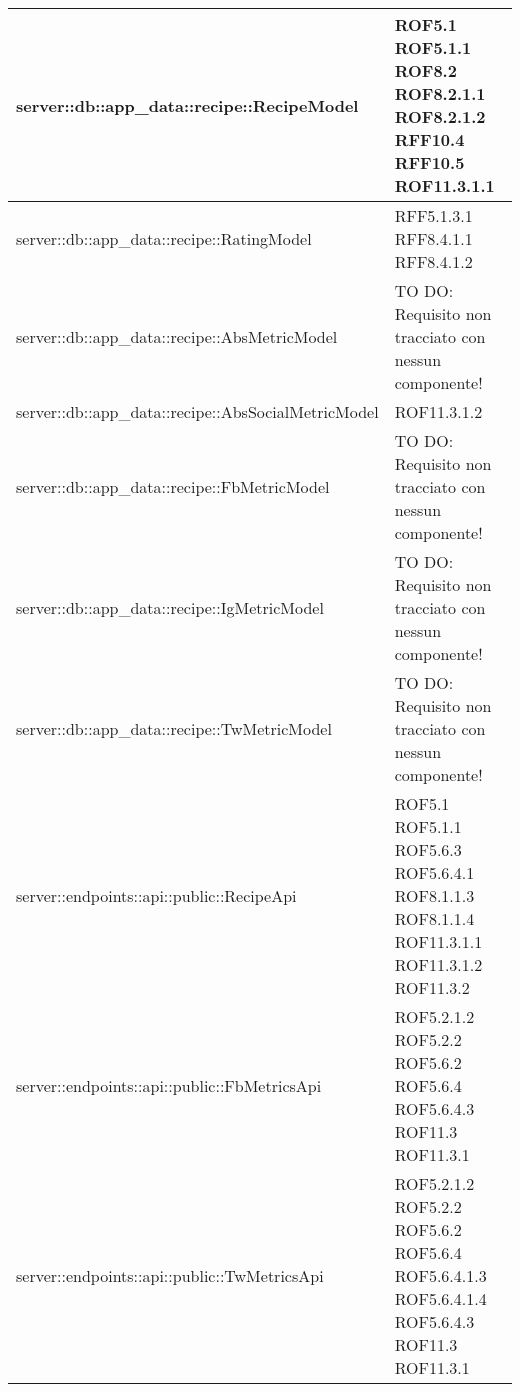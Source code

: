 \begin{center}
\begin{longtable}{| p{11cm} | p{2.5cm} |}
\hline
server::db::app\_data::recipe::RecipeModel & ROF5.1 \newline ROF5.1.1 \newline ROF8.2 \newline ROF8.2.1.1 \newline ROF8.2.1.2 \newline RFF10.4 \newline RFF10.5 \newline ROF11.3.1.1 \\
\hline
server::db::app\_data::recipe::RatingModel & RFF5.1.3.1 \newline RFF8.4.1.1 \newline RFF8.4.1.2 \\
\hline
server::db::app\_data::recipe::AbsMetricModel & TO DO: Requisito non tracciato con nessun componente! \\
\hline
server::db::app\_data::recipe::AbsSocialMetricModel & ROF11.3.1.2 \\
\hline
server::db::app\_data::recipe::FbMetricModel & TO DO: Requisito non tracciato con nessun componente! \\
\hline
server::db::app\_data::recipe::IgMetricModel & TO DO: Requisito non tracciato con nessun componente! \\
\hline
server::db::app\_data::recipe::TwMetricModel & TO DO: Requisito non tracciato con nessun componente! \\
\hline
server::endpoints::api::public::RecipeApi & ROF5.1 \newline ROF5.1.1 \newline ROF5.6.3 \newline ROF5.6.4.1 \newline ROF8.1.1.3 \newline ROF8.1.1.4 \newline ROF11.3.1.1 \newline ROF11.3.1.2 \newline ROF11.3.2 \\
\hline
server::endpoints::api::public::FbMetricsApi & ROF5.2.1.2 \newline ROF5.2.2 \newline ROF5.6.2 \newline ROF5.6.4 \newline ROF5.6.4.3 \newline ROF11.3 \newline ROF11.3.1 \\
\hline
server::endpoints::api::public::TwMetricsApi & ROF5.2.1.2 \newline ROF5.2.2 \newline ROF5.6.2 \newline ROF5.6.4 \newline ROF5.6.4.1.3 \newline ROF5.6.4.1.4 \newline ROF5.6.4.3 \newline ROF11.3 \newline ROF11.3.1 \\

\end{longtable}
\end{center}
